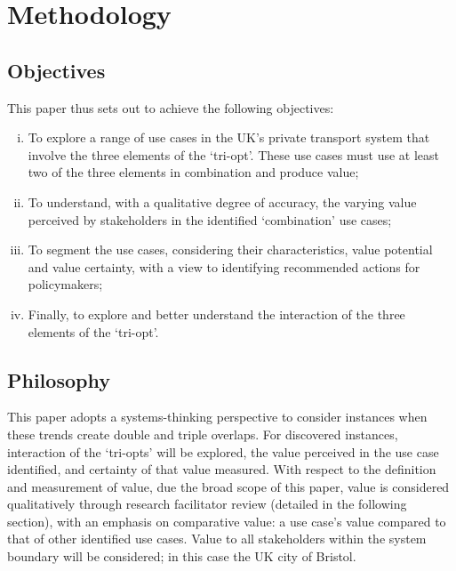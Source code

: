\documentclass[b5paper,10pt]{article}
\begin{document}
\section{Methodology}\label{methodology}

\subsection{Objectives}

This paper thus sets out to achieve the following objectives:

\begin{enumerate}[i)]
\item To explore a range of use cases in the UK's private transport
system that involve the three elements of the `tri-opt'. These use
cases must use at least two of the three elements in combination and
produce value;
\item To understand, with a qualitative degree of accuracy, the varying
value perceived by stakeholders in the identified `combination' use
cases;
\item To segment the use cases, considering their characteristics,
value potential and value certainty, with a view to identifying
recommended actions for policymakers;
\item Finally, to explore and better understand the interaction of the
  three elements of the `tri-opt'.
\end{enumerate}

\subsection{Philosophy}

This paper adopts a systems-thinking perspective to consider instances
when these trends create double and triple overlaps. For discovered
instances, interaction of the `tri-opts' will be explored, the value
perceived in the use case identified, and certainty of that value
measured. With respect to the definition and measurement of value, due
the broad scope of this paper, value is considered qualitatively
through research facilitator review (detailed in the following
section), with an emphasis on comparative value: a use case's value
compared to that of other identified use cases. Value to all
stakeholders within the system boundary will be considered; in this
case the UK city of Bristol.
\end{document}

